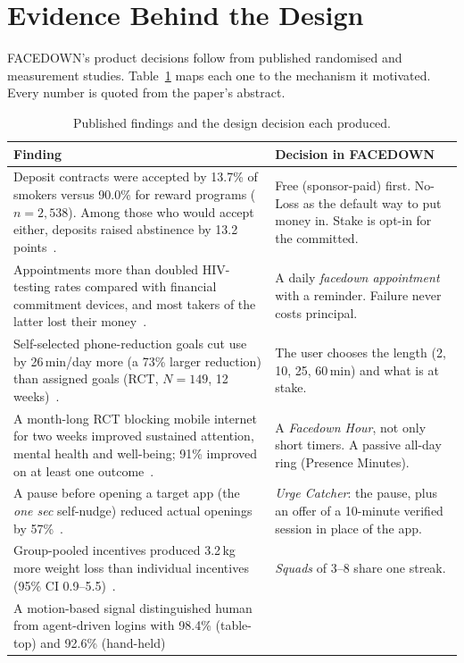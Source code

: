 \documentclass[10pt]{article}
\begin{document}
\section{Evidence Behind the Design}\label{sec:evidence-base}

FACEDOWN's product decisions follow from published randomised and measurement studies. Table~\ref{tab:evidence} maps
each one to the mechanism it motivated. Every number is quoted from the paper's abstract.

\begin{table}[h]\small
\caption{Published findings and the design decision each produced.}\label{tab:evidence}
\begin{tabularx}{\linewidth}{@{}X X@{}}\toprule
\textbf{Finding} & \textbf{Decision in FACEDOWN} \\\midrule
Deposit contracts were accepted by 13.7\% of smokers versus 90.0\% for reward programs ($n=2{,}538$). Among those who
would accept either, deposits raised abstinence by 13.2 points~\cite{halpern2015}. &
Free (sponsor-paid) first. No-Loss as the default way to put money in. Stake is opt-in for the committed. \\
Appointments more than doubled HIV-testing rates compared with financial commitment devices, and most takers of the
latter lost their money~\cite{derksen2021}. &
A daily \emph{facedown appointment} with a reminder. Failure never costs principal. \\
Self-selected phone-reduction goals cut use by 26\,min/day more (a 73\% larger reduction) than assigned goals (RCT,
$N=149$, 12 weeks)~\cite{sachdeva2026}. &
The user chooses the length (2, 10, 25, 60\,min) and what is at stake. \\
A month-long RCT blocking mobile internet for two weeks improved sustained attention, mental health and well-being; 91\%
improved on at least one outcome~\cite{castelo2025}. &
A \emph{Facedown Hour}, not only short timers. A passive all-day ring (Presence Minutes). \\
A pause before opening a target app (the \emph{one sec} self-nudge) reduced actual openings by 57\%~\cite{gruning2023}. &
\emph{Urge Catcher}: the pause, plus an offer of a 10-minute verified session in place of the app. \\
Group-pooled incentives produced 3.2\,kg more weight loss than individual incentives (95\% CI 0.9--5.5)~\cite{kullgren2013}. &
\emph{Squads} of 3--8 share one streak. \\
A motion-based signal distinguished human from agent-driven logins with 98.4\% (table-top) and 92.6\% (hand-held)

\end{tabularx}
\end{table}
\end{document}
